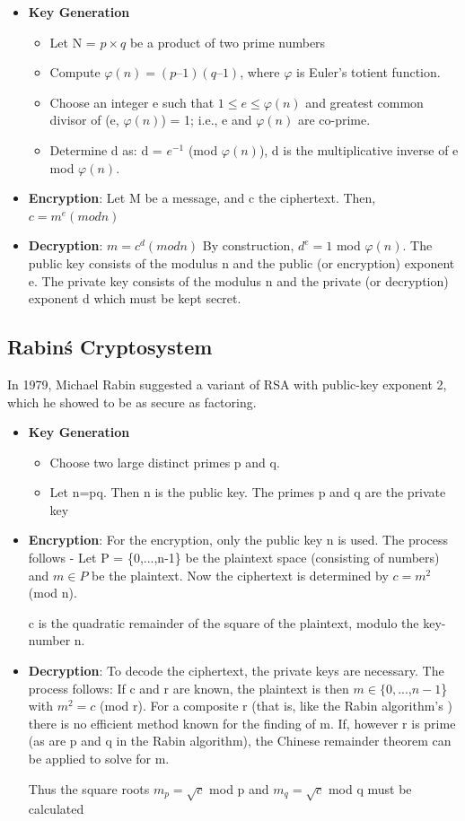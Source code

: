 \documentclass[12pt]{article} %
\begin{document}
\begin{itemize}
\item{\textbf{Key Generation}}
\begin{itemize}
\item{}Let N = $p\times q$ be a product of two prime numbers
\item{}Compute $\varphi(n) = (p – 1)(q – 1)$, where $\varphi$ is Euler's totient function.
\item{}Choose an integer e such that $1 \leq e \leq \varphi(n)$ and greatest common divisor of (e, $\varphi(n)$) = 1; i.e., e and $\varphi(n)$ are co-prime.
\item{}Determine d as: d = $e^{-1}$ (mod $\varphi(n)$), d is the multiplicative inverse of e mod $\varphi(n)$.
 \end{itemize}

\item{\textbf{Encryption}}:    Let M be a message, and c the ciphertext. Then,
        	$c = m^e (mod n)$
\item{\textbf{Decryption}}:  $m = c^d (mod n)$
By construction, $d^e= 1$ mod $\varphi(n)$. The public key consists of the modulus n and the public (or encryption) exponent e. The private key consists of the modulus n and the private (or decryption) exponent d which must be kept secret.
\end{itemize}
\subsection{Rabin\'s Cryptosystem}
In 1979, Michael Rabin suggested a variant of RSA with public-key exponent 2, which he showed to be as secure as factoring.
\begin{itemize}
\item{\textbf{Key Generation}}
\begin{itemize}
\item{}Choose two large distinct primes p and q.
\item{}Let n=pq. Then n is the public key. The primes p and q are the private key
 \end{itemize}

\item{\textbf{Encryption}}:  For the encryption, only the public key n is used. The process follows -
Let  P = \{0,...,n-1\} be the plaintext space (consisting of numbers) and $m \in P$ be the plaintext. Now the ciphertext  is determined by $c = m^2 $(mod n).


c is the quadratic remainder of the square of the plaintext, modulo the key-number n.
\item{\textbf{Decryption}}:
To decode the ciphertext, the private keys are necessary. The process follows:
If c and r are known, the plaintext is then $m \in \{0,$...,$n-1$\} with $m^2=c$ (mod r). For a composite r (that is, like the Rabin algorithm's ) there is no efficient method known for the finding of m. If, however r is prime (as are p and q in the Rabin algorithm), the Chinese remainder theorem can be applied to solve for m.

Thus the square roots
$ m_p = \sqrt{c}$ mod p
and
$ m_q = \sqrt{c}$ mod q must be calculated
\end{itemize}
\end{document}

